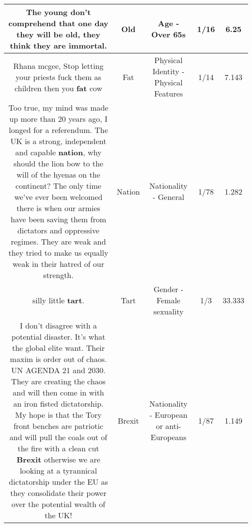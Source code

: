 \documentclass[11pt]{article}
\newlength\mylength
\begin{document}
\begin{center}
\begin{longtable}{|C{.65\mylength}|C{.30\mylength}|C{.12\mylength}|C{.12\mylength}|C{.12\mylength}|}
  \small The young don't comprehend that one day they will be \textbf{old}, they think they are immortal.\normalsize   & Old & Age - Over 65s & 1/16 & 6.25 \\  \hline
  \small Rhana mcgee, Stop letting your priests fuck them as children then you \textbf{fat} cow\normalsize   & Fat & Physical Identity - Physical Features & 1/14 & 7.143 \\  \hline
  \small Too true, my mind was made up more than 20 years ago, I longed for a referendum. The UK is a strong, independent and capable \textbf{nation}, why should the lion bow to the will of the hyenas on the continent? The only time we've ever been welcomed there is when our armies have been saving them from dictators and oppressive regimes. They are weak and they tried to make us equally weak in their hatred of our strength.\normalsize   & Nation & Nationality - General & 1/78 & 1.282 \\  \hline
  \small silly little \textbf{tart}.\normalsize   & Tart & Gender - Female sexuality & 1/3 & 33.333 \\  \hline
  \small I don't disagree with a potential disaster. It's what the global elite want. Their maxim is order out of chaos. UN AGENDA 21 and 2030. They are creating the chaos and will then come in with an iron fisted dictatorship. My hope is that the Tory front benches are patriotic and will pull the coals out of the fire with a clean cut \textbf{Brexit} otherwise we are looking at a tyrannical dictatorship under the EU as they consolidate their power over the potential wealth of the UK!\normalsize   & Brexit & Nationality - European or anti-Europeans & 1/87 & 1.149 \\  \hline

\end{longtable}
\end{center}
\end{document}
